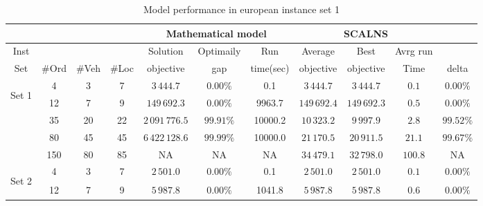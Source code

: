\documentclass[../main.tex]{subfiles}
\begin{document}
\begin{table}
    \centering
    \caption{Model performance in european instance set 1}
    \begin{adjustbox}{width=0.95\columnwidth,center}
            \begin{tabular}{|cccc|ccc|ccc|c|}
                \hline
                    &    &       &       & \multicolumn{3}{c}{Mathematical model}    & \multicolumn{3}{|c|}{SCALNS}                & \\
                \hline
                    Inst&           &       &       & Solution      & Optimaily     & Run       & Average       & Best      & Avrg run      &              \\ 
                    Set & #Ord      & #Veh  & #Loc  & objective     & gap           & time(sec) & objective     & objective & Time          & delta        \\ 
            \hline
                \multirow{5}{*}{\begin{sideways} Set 1 \end{sideways}}  
                        & 4       & 3     & 7     & $3\,444.7$      & $0.00\%$      & 0.1       & $3\,444.7$    & $3\,444.7$    & $0.1$     & $0.00\%$  \\
                        & 12      & 7     & 9     & $149\,692.3$    & $0.00\%$      & 9963.7    & $149\,692.4$  & $149\,692.3$  & $0.5$     & $0.00\%$  \\
                        & 35      & 20    & 22    & $2\,091\,776.5$ & $99.91\%$     & 10000.2   & $10\,323.2$   & $9\,997.9$    & $2.8$     & $99.52\%$  \\
                        & 80      & 45    & 45    & $6\,422\,128.6$ & $99.99\%$     & 10000.0   & $21\,170.5$   & $20\,911.5$   & $21.1$    & $99.67\%$  \\
                        & 150     & 80    & 85    & NA              & NA            & NA        & $34\,479.1$   & $32\,798.0$   & $100.8$   & NA  \\
            \hline
                \multirow{5}{*}{\begin{sideways} Set 2 \end{sideways}}  
                        & 4       & 3     & 7     & $2\,501.0$      & $0.00\%$      & 0.1       & $2\,501.0$    & $2\,501.0$    & $0.1$     & $0.00\%$  \\
                        & 12      & 7     & 9     & $5\,987.8$      & $0.00\%$      & 1041.8    & $5\,987.8$    & $5\,987.8$    & $0.6$     & $0.00\%$  \\

\end{tabular}
\end{adjustbox}
\end{table}
\end{document}
